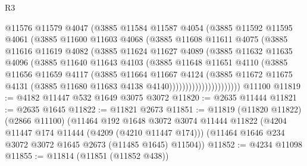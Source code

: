 \begin{lexlean}{R3}
\begin{coremodule}
                      @11576
                      @11579
                      @4047
                      (@3885
                        @11584
                        @11587
                        @4054
                        (@3885
                          @11592
                          @11595
                          @4061
                          (@3885
                            @11600
                            @11603
                            @4068
                            (@3885
                              @11608
                              @11611
                              @4075
                              (@3885
                                @11616
                                @11619
                                @4082
                                (@3885
                                  @11624
                                  @11627
                                  @4089
                                  (@3885
                                    @11632
                                    @11635
                                    @4096
                                    (@3885
                                      @11640
                                      @11643
                                      @4103
                                      (@3885
                                        @11648
                                        @11651
                                        @4110
                                        (@3885
                                          @11656
                                          @11659
                                          @4117
                                          (@3885
                                            @11664
                                            @11667
                                            @4124
                                            (@3885
                                              @11672
                                              @11675
                                              @4131
                                              (@3885 @11680 @11683 @4138 @4140))))))))))))))))))))))
    @11100
@11819 := @4182 @11447 @532 @1649 @3075 @3072
@11820 := @2635 @11444
@11821 := @2635 @1645
@11822 := @11821 @2673
@11851 := @11819
    (@11820 @11822)
    (@2866 @11100)
    (@11464
      @192
      @1648
      @3072
      @3074
      @11444
      @11822
      (@4204 @11447 @174 @11444 (@4209 (@4210 @11447 @174)))
      (@11464 @1646 @234 @3072 @3072 @1645 @2673 (@11485 @1645) @11504))
@11852 := @4234 @11098
@11855 := @11814 (@11851 (@11852 @438))

\end{coremodule}
\end{lexlean}
